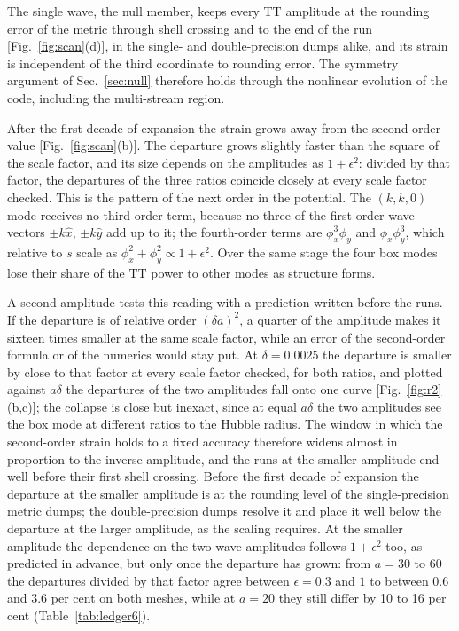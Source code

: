 \documentclass[aps,prd,twocolumn,10pt,superscriptaddress,nofootinbib,longbibliography,floatfix]{revtex4-2}
\begin{document}
The single wave, the null member, keeps every TT amplitude at the rounding error of the metric through shell crossing and to the end of the run [Fig.~\ref{fig:scan}(d)], in the single- and double-precision dumps alike, and its strain is independent of the third coordinate to rounding error. The symmetry argument of Sec.~\ref{sec:null} therefore holds through the nonlinear evolution of the code, including the multi-stream region.

After the first decade of expansion the strain grows away from the second-order value [Fig.~\ref{fig:scan}(b)]. The departure grows slightly faster than the square of the scale factor, and its size depends on the amplitudes as $1+\epsilon^2$: divided by that factor, the departures of the three ratios coincide closely at every scale factor checked. This is the pattern of the next order in the potential. The $(k,k,0)$ mode receives no third-order term, because no three of the first-order wave vectors $\pm k\hat x$, $\pm k\hat y$ add up to it; the fourth-order terms are $\phi_x^3\phi_y$ and $\phi_x\phi_y^3$, which relative to $s$ scale as $\phi_x^2+\phi_y^2\propto1+\epsilon^2$. Over the same stage the four box modes lose their share of the TT power to other modes as structure forms.

A second amplitude tests this reading with a prediction written before the runs. If the departure is of relative order $(\delta a)^2$, a quarter of the amplitude makes it sixteen times smaller at the same scale factor, while an error of the second-order formula or of the numerics would stay put. At $\delta=0.0025$ the departure is smaller by close to that factor at every scale factor checked, for both ratios, and plotted against $a\delta$ the departures of the two amplitudes fall onto one curve [Fig.~\ref{fig:r2}(b,c)]; the collapse is close but inexact, since at equal $a\delta$ the two amplitudes see the box mode at different ratios to the Hubble radius. The window in which the second-order strain holds to a fixed accuracy therefore widens almost in proportion to the inverse amplitude, and the runs at the smaller amplitude end well before their first shell crossing. Before the first decade of expansion the departure at the smaller amplitude is at the rounding level of the single-precision metric dumps; the double-precision dumps resolve it and place it well below the departure at the larger amplitude, as the scaling requires. At the smaller amplitude the dependence on the two wave amplitudes follows $1+\epsilon^2$ too, as predicted in advance, but only once the departure has grown: from $a=30$ to $60$ the departures divided by that factor agree between $\epsilon=0.3$ and $1$ to between 0.6 and 3.6 per cent on both meshes, while at $a=20$ they still differ by 10 to 16 per cent (Table~\ref{tab:ledger6}).
\end{document}
